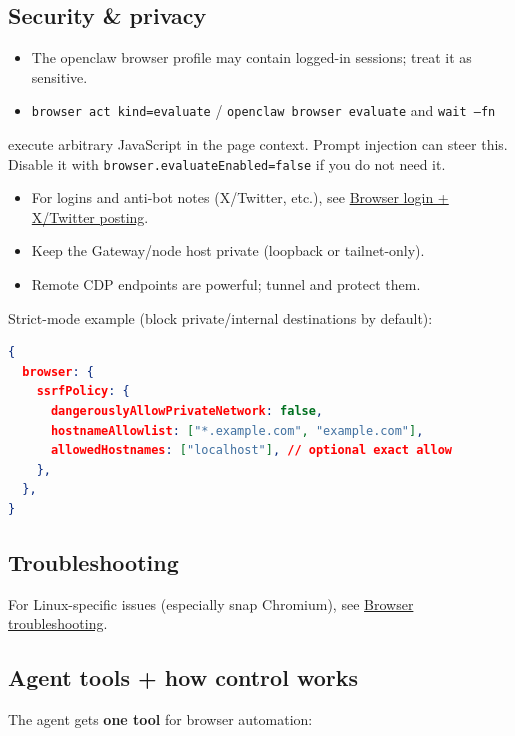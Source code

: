 \subsection{Security \& privacy}


\begin{itemize}
  \item The openclaw browser profile may contain logged-in sessions; treat it as sensitive.
  \item \texttt{browser act kind=evaluate} / \texttt{openclaw browser evaluate} and \texttt{wait --fn}
\end{itemize}

execute arbitrary JavaScript in the page context. Prompt injection can steer
this. Disable it with \texttt{browser.evaluateEnabled=false} if you do not need it.
\begin{itemize}
  \item For logins and anti-bot notes (X/Twitter, etc.), see \href{/tools/browser-login}{Browser login + X/Twitter posting}.
  \item Keep the Gateway/node host private (loopback or tailnet-only).
  \item Remote CDP endpoints are powerful; tunnel and protect them.
\end{itemize}


Strict-mode example (block private/internal destinations by default):

\begin{lstlisting}[language=json]
{
  browser: {
    ssrfPolicy: {
      dangerouslyAllowPrivateNetwork: false,
      hostnameAllowlist: ["*.example.com", "example.com"],
      allowedHostnames: ["localhost"], // optional exact allow
    },
  },
}
\end{lstlisting}


\subsection{Troubleshooting}


For Linux-specific issues (especially snap Chromium), see
\href{/tools/browser-linux-troubleshooting}{Browser troubleshooting}.

\subsection{Agent tools + how control works}


The agent gets \textbf{one tool} for browser automation:

